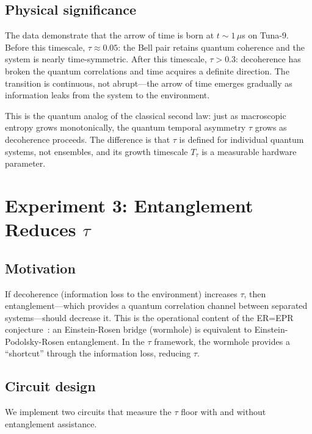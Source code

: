 \documentclass[prl,twocolumn,superscriptaddress,longbibliography,floatfix]{revtex4-2}
\newcommand{\tauasym}{\tau}
\begin{document}
\subsection{Physical significance}

The data demonstrate that the arrow of time is born at
$t \sim 1\,\mu$s on Tuna-9.  Before this timescale,
$\tauasym \approx 0.05$: the Bell pair retains quantum coherence
and the system is nearly time-symmetric.  After this timescale,
$\tauasym > 0.3$: decoherence has broken the quantum correlations
and time acquires a definite direction.  The transition is
continuous, not abrupt---the arrow of time emerges gradually as
information leaks from the system to the environment.

This is the quantum analog of the classical second law: just as
macroscopic entropy grows monotonically, the quantum temporal
asymmetry $\tauasym$ grows as decoherence proceeds.  The difference
is that $\tauasym$ is defined for individual quantum systems, not
ensembles, and its growth timescale $T_\tauasym$ is a measurable
hardware parameter.

\section{Experiment 3: Entanglement Reduces $\tauasym$}
\label{sec:entanglement}

\subsection{Motivation}

If decoherence (information loss to the environment) increases
$\tauasym$, then entanglement---which provides a quantum
correlation channel between separated systems---should decrease it.
This is the operational content of the ER=EPR
conjecture~\cite{Maldacena2013}: an Einstein-Rosen bridge
(wormhole) is equivalent to Einstein-Podolsky-Rosen entanglement.
In the $\tauasym$ framework, the wormhole provides a ``shortcut''
through the information loss, reducing $\tauasym$.

\subsection{Circuit design}

We implement two circuits that measure the $\tauasym$ floor with
and without entanglement assistance.
\end{document}
